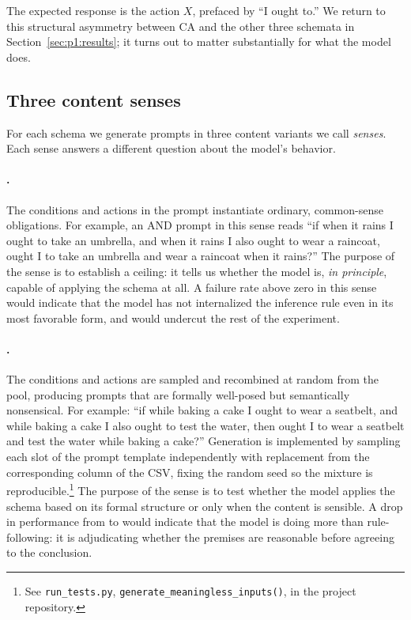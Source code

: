 \noindent The expected response is the action $X$, prefaced by ``I ought
to.'' We return to this structural asymmetry between CA and the other
three schemata in Section~\ref{sec:p1:results}; it turns out to matter
substantially for what the model does.

\subsection{Three content senses}
\label{subsec:p1:methods:senses}

For each schema we generate prompts in three content variants we call
\emph{senses}. Each sense answers a different question about the model's
behavior.

\paragraph{\MEAN.}
The conditions and actions in the prompt instantiate ordinary,
common-sense obligations. For example, an AND prompt in this sense reads
``if when it rains I ought to take an umbrella, and when it rains I also
ought to wear a raincoat, ought I to take an umbrella and wear a raincoat
when it rains?'' The purpose of the \MEAN{} sense is to establish a
ceiling: it tells us whether the model is, \emph{in principle}, capable
of applying the schema at all. A failure rate above zero in this sense
would indicate that the model has not internalized the inference rule
even in its most favorable form, and would undercut the rest of the
experiment.

\paragraph{\MLESS.}
The conditions and actions are sampled and recombined at random from the
\MEAN{} pool, producing prompts that are formally well-posed but
semantically nonsensical. For example: ``if while baking a cake I ought
to wear a seatbelt, and while baking a cake I also ought to test the
water, then ought I to wear a seatbelt and test the water
while baking a cake?'' Generation is implemented by sampling each slot
of the prompt template independently with replacement from the
corresponding column of the \MEAN{} CSV, fixing the random seed so the
mixture is reproducible.\footnote{See \texttt{run\_tests.py},
\texttt{generate\_meaningless\_inputs()}, in the project repository.}
The purpose of the \MLESS{} sense is to test whether the model applies
the schema based on its formal structure or only when the content is
sensible. A drop in performance from \MEAN{} to \MLESS{} would
indicate that the model is doing more than rule-following: it is
adjudicating whether the premises are reasonable before agreeing to the
conclusion.

